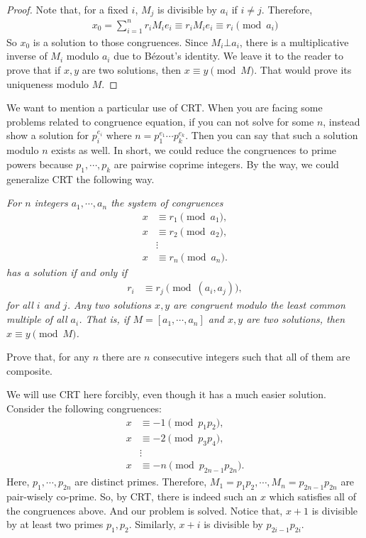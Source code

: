 \documentclass{subfile}
\begin{document}
		\begin{proof}
			Note that, for a fixed $i$, $M_j$ is divisible by $a_i$ if $i\neq j$. Therefore,
			\begin{align*}
			x_0 = \sum_{i=1}^{n} r_i M_ie_i \equiv r_iM_ie_i\equiv r_i\pmod{a_i}
			\end{align*}
			So $x_0$ is a solution to those congruences. Since $M_i\bot a_i$, there is a multiplicative inverse of $M_i$ modulo $a_i$ due to B\'{e}zout's identity. We leave it to the reader to prove that if $x,y$ are two solutions, then $x\equiv y\pmod M$. That would prove its uniqueness modulo $M$.
		\end{proof}
	We want to mention a particular use of CRT. When you are facing some problems related to congruence equation, if you can not solve for some $n$, instead show a solution for $p_i^{e_i}$ where $n=p_1^{e_1}\cdots p_k^{e_k}$. Then you can say that such a solution modulo $n$ exists as well. In short, we could reduce the congruences to prime powers because $p_1,\cdots,p_k$ are pairwise coprime integers. By the way, we could generalize CRT the following way.
		\begin{theorem}\slshape
			For $n$ integers $a_1,\cdots,a_n$ the system of congruences
			\begin{align*}
				x & \equiv r_1\pmod{a_1},\\
				x & \equiv r_2\pmod{a_2},\\
				&\vdots\\
				x & \equiv r_n\pmod{a_n}.
			\end{align*}
			has a solution if and only if
			\begin{align*}
				r_i & \equiv r_j\pmod{(a_i,a_j)},
			\end{align*}
			for all $i$ and $j$. Any two solutions $x,y$ are congruent modulo the least common multiple of all $a_i$. That is, if $M=[a_1,\cdots,a_n]$ and $x,y$ are two solutions, then $x\equiv y\pmod M$.
		\end{theorem}

		\begin{problem}
			Prove that, for any $n$ there are $n$ consecutive integers such that all of them are composite.
		\end{problem}

		\begin{solution}
			We will use CRT here forcibly, even though it has a much easier solution. Consider the following congruences:
				\begin{align*}
					x & \equiv -1\pmod{p_1p_2},\\
					x & \equiv -2\pmod{p_3p_4},\\
					  & \vdots \\
					x & \equiv -n\pmod{p_{2n-1}p_{2n}}.
				\end{align*}
			Here, $p_1,\cdots,p_{2n}$ are distinct primes. Therefore, $M_1=p_1p_2,\cdots,M_n=p_{2n-1}p_{2n}$ are pair-wisely co-prime. So, by CRT, there is indeed such an $x$ which satisfies all of the congruences above. And our problem is solved. Notice that, $x+1$ is divisible by at least two primes $p_1,p_2$. Similarly, $x+i$ is divisible by $p_{2i-1}p_{2i}$.
		\end{solution}
\end{document}
